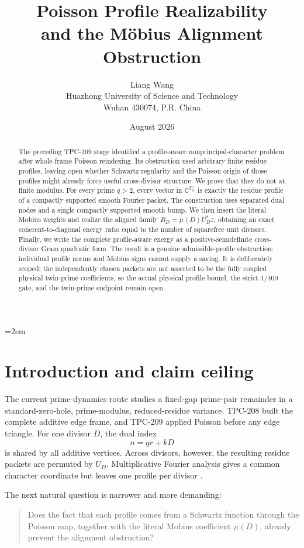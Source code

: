 \documentclass[11pt]{article}
\title{\textbf{Poisson Profile Realizability\\
and the M\"obius Alignment Obstruction}}
\author{Liang Wang\\
Huazhong University of Science and Technology\\
Wuhan 430074, P.R. China}
\date{August 2026}
\newcommand{\Fq}{\mathbb F_q}
\newcommand{\C}{\mathbb C}
\begin{document}
\emergencystretch=2em
\maketitle

\begin{abstract}
The preceding TPC-209 stage identified a profile-aware nonprincipal-character
problem after whole-frame Poisson reindexing.  Its obstruction used arbitrary
finite residue profiles, leaving open whether Schwartz regularity and the
Poisson origin of those profiles might already force useful cross-divisor
structure.  We prove that they do not at finite modulus.  For every prime
$q>2$, every vector in $\C^{\Fq^\times}$ is exactly the residue profile of a
compactly supported smooth Fourier packet.  The construction uses separated
dual nodes and a single compactly supported smooth bump.  We then insert the
literal Mobius weights and realize the aligned family
$B_D=\mu(D)U_D^*z$, obtaining an exact coherent-to-diagonal energy ratio equal
to the number of squarefree unit divisors.  Finally, we write the complete
profile-aware energy as a positive-semidefinite cross-divisor Gram quadratic
form.  The result is a genuine admissible-profile obstruction: individual
profile norms and Mobius signs cannot supply a saving.  It is deliberately
scoped; the independently chosen packets are not asserted to be the fully
coupled physical twin-prime coefficients, so the actual physical profile bound,
the strict $1/400$ gate, and the twin-prime endpoint remain open.
\end{abstract}

\section{Introduction and claim ceiling}

The current prime-dynamics route studies a fixed-gap prime-pair remainder in a
standard-zero-hole, prime-modulus, reduced-residue variance.  TPC-208 built the
complete additive edge frame, and TPC-209 applied Poisson before any edge
triangle.  For one divisor $D$, the dual index
\[
 n=qr+kD
\]
is shared by all additive vertices.  Across divisors, however, the resulting
residue packets are permuted by $U_D$.  Multiplicative Fourier analysis gives a
common character coordinate but leaves one profile per divisor
\cite{Wang2026TPC209}.

The next natural question is narrower and more demanding:
\begin{quote}
Does the fact that each profile comes from a Schwartz function through the
Poisson map, together with the literal Mobius coefficient $\mu(D)$, already
prevent the alignment obstruction?
\end{quote}
\end{document}
